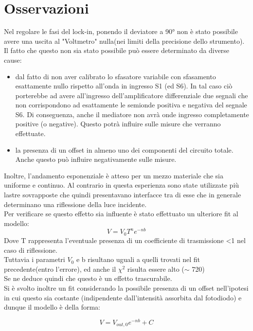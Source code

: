 \section{Osservazioni}
Nel regolare le fasi del lock-in, ponendo il deviatore a 90° non è stato possibile avere una uscita al "Voltmetro" nulla(nei limiti della precisione dello strumento).\\
Il fatto che questo non sia stato possibile può essere determinato da diverse cause:
\begin{itemize}
\item dal fatto di non aver calibrato lo sfasatore variabile con sfasamento esattamente nullo rispetto all'onda in ingresso S1 (ed S6).
In tal caso ciò porterebbe ad avere all'ingresso dell'amplificatore differenziale due segnali che non corrispondono ad esattamente le semionde positiva e negativa del segnale S6. Di conseguenza, anche il mediatore non avrà onde ingresso completamente positive (o negative). Questo potrà influire sulle misure che verranno effettuate.\\
\item la presenza di un offset in almeno uno dei componenti del circuito totale. Anche questo può influire negativamente sulle misure.
\end{itemize} 
Inoltre, l'andamento esponenziale è atteso per un mezzo materiale che sia uniforme e continuo. Al contrario in questa esperienza sono state utilizzate più lastre sovrapposte che quindi presentavano interfacce tra di esse che in generale determinano una riflessione della luce incidente.\\
Per verificare se questo effetto sia influente è stato effettuato un ulteriore fit al modello:
\begin{equation}
V=V_{0}T^{n}e^{-nb}
\end{equation}
Dove T rappresenta l'eventuale presenza di un coefficiente di trasmissione <1 nel caso di riflessione.\\
Tuttavia i parametri $V_{0}$ e b risultano uguali a quelli trovati nel fit precedente(entro l'errore), ed anche il $\chi^{2}$ risulta essere alto ($\sim$ 720)\\
Se ne deduce quindi che questo è un effetto trascurabile.\\
Si è svolto inoltre un fit considerando la possibile presenza di un offset nell'ipotesi in cui questo sia costante (indipendente dall'intensità assorbita dal fotodiodo) e dunque il modello è della forma:

\begin{equation}
V=V_{out,0}e^{-nb} + C
\end{equation}

